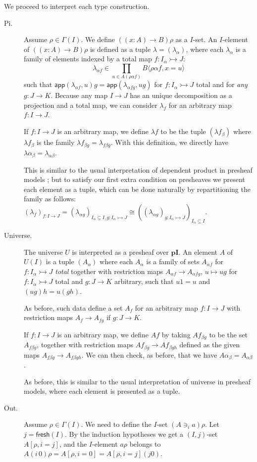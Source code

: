 \documentclass[english]{PaperTools/latex/entcs}
\theoremstyle{plain}
\theoremstyle{definition}
\theoremstyle{remark}
\newcommand\op[1]{∋_{#1}}
\def\pI{\ensuremath{\mathbf{pI}}}
\def\fresh#1{\mathsf{fresh}(#1)}
\def\app#1#2{\mathsf{app}(#1,#2)}
\begin{document}
\smallskip
We proceed to interpret each type construction.
\begin{description}
  \item[\sc Pi.]
    Assume $ρ ∈ Γ(I)$. We define $((x:A) → B)ρ$ as a $I$-set.
    An $I$-element of $((x:A) → B)ρ$ is defined as a tuple $λ = (λ_α)$,
    where each $λ_α$ is a family of elements indexed by a total map $f : I_α ↣ J$:
    $$λ_{α f} ∈ \prod_{u ∈ A(ραf)} B⟨ραf,x=u⟩$$
    such that
    $\app{λ_{αf}}{u} g = \app{λ_{α fg}}{ug}$ for $f : I_α ↣ J$ total and
    for \emph{any} $g : J → K$.
    Because any map $I → J$ has an unique decomposition as a projection and a total
    map, we can consider $λ_f$ for an arbitrary map $f : I → J$.

    If $f : I → J$ is an arbitrary map, we define $λ f$ to be the tuple
    $(λf_β)$ where $λf_β$ is the family $λf_{βg} = λ_{fβg}$.
    With this definition, we directly have $λα_{β} = λ_{αβ}$.

    This is similar to the usual interpretation of dependent product in
    presheaf models \citep{Hofmann97syntaxand,bezem2014model}; but to
    satisfy our first extra condition on presheaves we present
    each element as a tuple, which can be done naturally by repartitioning
    the family as follows:
    $(λ_f)_{f : I → J} = (λ_{αg})_{I_α ⊆ I, g : I_α ↣ J} ≅
     ((λ_{αg})_{g : I_α ↣ J})_{I_α ⊆ I}$.


  \item[\sc Universe.]
    The universe $U$ is interpreted as a presheaf over \pI. An element $A$ of
    $U(I)$ is a tuple $(A_α)$ where each $A_α$ is a family of sets
    $A_{α f}$ for $f : I_α ↣ J$ \emph{total} together with restriction
    maps $A_{α f} → A_{α fg}$, $u ↦ ug$ for $f : I_α ↣ J$ total
    and $g : J → K$ arbitrary, such that $u1 = u$ and $(ug)h = u(gh)$.

    As before, such data define a set $A_f$ for an arbitrary map $f : I → J$
    with restriction maps $A_f → A_{fg}$ if $g : J → K$.

    If $f : I → J$ is an arbitrary map, we define $Af$ by taking $Af_{βg}$
    to be the set $A_{fβg}$, together with restriction maps $Af_{βg} → Af_{βgh}$
    defined as the given maps $A_{fβg} → A_{fβgh}$.
    We can then check, as before, that we have $Aα_{β} = A_{αβ}$.

    As before, this is similar to the usual interpretation of universe in
    presheaf models, where each element is presented as a tuple.


  \item[\sc Out.]
    Assume $ρ ∈ Γ(I)$. We need to define the $I$-set $(A \op {i} a)ρ$.
    Let $j = \fresh I$.
    By the induction hypotheses we get a $(I,j)$-set $A[ρ,i=j]$,
    and the $I$-element $aρ$ belongs to
    $A(i\,0)ρ = A[ρ,i=0] = A[ρ,i=j](j 0)$.


\end{description}
\end{document}
